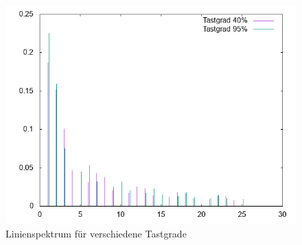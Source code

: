         \begin{figure}
            \includegraphics[width=\textwidth]{A25_plot2.png}
            \caption{Linienspektrum für verschiedene Tastgrade}
        \end{figure}
\newpage
